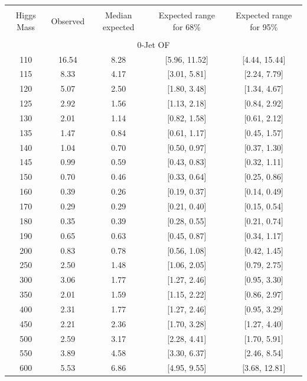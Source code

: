 \begin{table}[hbp!]
\begin{center}
\begin{tabular}{c c c c c}
\hline
\vspace{-3mm} && \\
 Higgs Mass & Observed  & Median expected & Expected range for 68\% & Expected range for 95\%   \\
\vspace{-3mm} && \\
\hline
\multicolumn{5}{c}{0-Jet OF} \\
\hline
110 & 16.54 & 8.28 & [5.96, 11.52] & [4.44, 15.44] \\
115 & 8.33 & 4.17 & [3.01, 5.81] & [2.24, 7.79] \\
120 & 5.07 & 2.50 & [1.80, 3.48] & [1.34, 4.67] \\
125 & 2.92 & 1.56 & [1.13, 2.18] & [0.84, 2.92] \\
130 & 2.01 & 1.14 & [0.82, 1.58] & [0.61, 2.12] \\
135 & 1.47 & 0.84 & [0.61, 1.17] & [0.45, 1.57] \\
140 & 1.04 & 0.70 & [0.50, 0.97] & [0.37, 1.30] \\
145 & 0.99 & 0.59 & [0.43, 0.83] & [0.32, 1.11] \\
150 & 0.70 & 0.46 & [0.33, 0.64] & [0.25, 0.86] \\
160 & 0.39 & 0.26 & [0.19, 0.37] & [0.14, 0.49] \\
170 & 0.29 & 0.29 & [0.21, 0.40] & [0.15, 0.54] \\
180 & 0.35 & 0.39 & [0.28, 0.55] & [0.21, 0.74] \\
190 & 0.65 & 0.63 & [0.45, 0.87] & [0.34, 1.17] \\
200 & 0.83 & 0.78 & [0.56, 1.08] & [0.42, 1.45] \\
250 & 2.50 & 1.48 & [1.06, 2.05] & [0.79, 2.75] \\
300 & 3.06 & 1.77 & [1.27, 2.46] & [0.95, 3.30] \\
350 & 2.01 & 1.59 & [1.15, 2.22] & [0.86, 2.97] \\
400 & 2.31 & 1.77 & [1.27, 2.46] & [0.95, 3.29] \\
450 & 2.21 & 2.36 & [1.70, 3.28] & [1.27, 4.40] \\
500 & 2.59 & 3.17 & [2.28, 4.41] & [1.70, 5.91] \\
550 & 3.89 & 4.58 & [3.30, 6.37] & [2.46, 8.54] \\
600 & 5.53 & 6.86 & [4.95, 9.55] & [3.68, 12.81] \\

\end{tabular}
\end{center}
\end{table}
